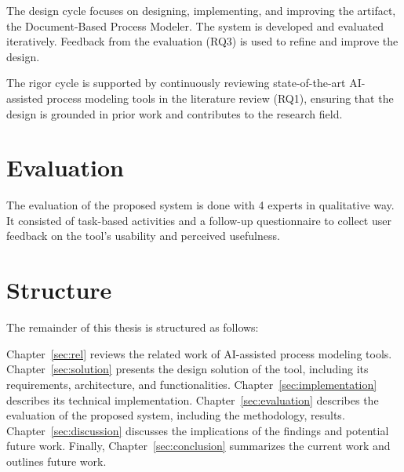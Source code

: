 The design cycle focuses on designing, implementing, and improving the artifact, the Document-Based Process Modeler. The system is developed and evaluated iteratively. Feedback from the evaluation (RQ3) is used to refine and improve the design.

The rigor cycle is supported by continuously reviewing state-of-the-art AI-assisted process modeling tools in the literature review (RQ1), ensuring that the design is grounded in prior work and contributes to the research field.

\section{Evaluation}
\label{sec:intro:ev}
The evaluation of the proposed system is done with 4 experts in qualitative way. It consisted of task-based activities and a follow-up questionnaire to collect user feedback on the tool's usability and perceived usefulness.

\section{Structure}
\label{sec:intro:struct}
The remainder of this thesis is structured as follows:

Chapter~\ref{sec:rel} reviews the related work of AI-assisted process modeling tools. Chapter~\ref{sec:solution} presents the design solution of the tool, including its requirements, architecture, and functionalities. Chapter~\ref{sec:implementation} describes its technical implementation. Chapter~\ref{sec:evaluation} describes the evaluation of the proposed system, including the methodology, results. Chapter~\ref{sec:discussion} discusses the implications of the findings and potential future work. Finally, Chapter~\ref{sec:conclusion} summarizes the current work and outlines future work.
